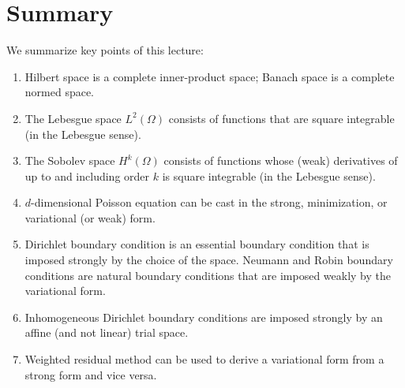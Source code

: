 \section{Summary}
We summarize key points of this lecture:
\begin{enumerate}
\item Hilbert space is a complete inner-product space; Banach space is a complete normed space.
\item The Lebesgue space $L^2(\Omega)$ consists of functions that are square integrable (in the Lebesgue sense).
\item The Sobolev space $H^k(\Omega)$ consists of functions whose (weak) derivatives of up to and including order $k$ is square integrable (in the Lebesgue sense).
\item $d$-dimensional Poisson equation can be cast in the strong, minimization, or variational (or weak) form.
\item Dirichlet boundary condition is an essential boundary condition that is imposed strongly by the choice of the space.  Neumann and Robin boundary conditions are natural boundary conditions that are imposed weakly by the variational form.
\item Inhomogeneous Dirichlet boundary conditions are imposed strongly by an affine (and not linear) trial space.
\item Weighted residual method can be used to derive a variational form from a strong form and vice versa. 
\end{enumerate}




